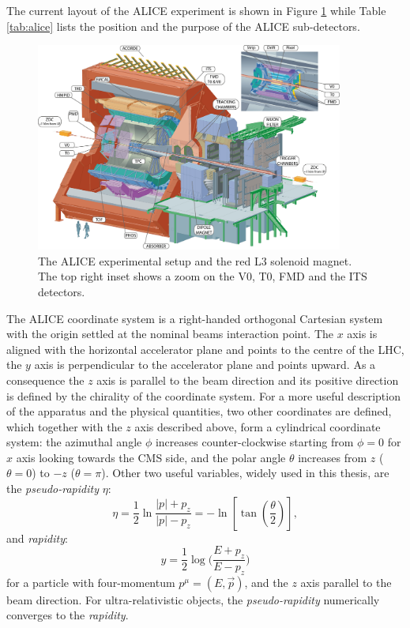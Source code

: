 The current layout of the ALICE experiment is shown in Figure \ref{fig:alice3D} while Table 
\ref{tab:alice} lists the position and the purpose of the ALICE sub-detectors.
\begin{figure}
    \centering
    \includegraphics[width=0.9\textwidth]{gfx/alice3D}
	\caption{The ALICE experimental setup and the red L3 solenoid magnet. The top right inset shows a zoom on the V0, T0, FMD and the ITS detectors.}
	\label{fig:alice3D}
\end{figure}
The ALICE coordinate system is a right-handed orthogonal Cartesian system with the origin settled at
the nominal beams interaction point.
The $x$ axis is aligned with the horizontal accelerator plane and points to the centre of the LHC,
the $y$ axis is perpendicular to the accelerator plane and points upward.
As a consequence the $z$ axis is parallel to the beam direction and its positive direction is 
defined by the chirality of the coordinate system. 
For a more useful description of the apparatus and the physical quantities, two other coordinates
are defined, which together with the $z$ axis described above, form a cylindrical coordinate system:
the azimuthal angle $\phi$ increases counter-clockwise starting from $\phi = 0$ for $x$ axis looking
towards the CMS side, and the polar angle $\theta$ increases from $z$ ($\theta=0$) to $-z$ 
($\theta=\pi$).
Other two useful variables, widely used in this thesis, are the \textit{pseudo-rapidity} $\eta$:
\begin{equation}
    \eta = \frac{1}{2} \ln \frac{|p| + p_{z}}{|p| - p_{z}} =
     - \ln \left[ \tan \left(\frac{\theta}{2} \right) \right],
\end{equation}
and \textit{rapidity}:
\begin{equation} \label{eq:rapidity}
    y = \frac{1}{2} \log \bigl( \frac{E+p_{z}}{E-p_{z}} \bigr) 
\end{equation}
for a particle with four-momentum $p^{\mu} = (E,\vec{p})$, and the $z$ axis parallel to the beam 
direction.
For ultra-relativistic objects, the \textit{pseudo-rapidity} numerically converges to the 
\textit{rapidity}.

